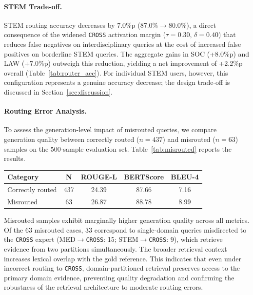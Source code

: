 \documentclass[a4paper,fleql]{cas-sc}
\begin{document}
\paragraph{STEM Trade-off.}
STEM routing accuracy decreases by 7.0\%p (87.0\%$\to$80.0\%), a direct
consequence of the widened \texttt{CROSS} activation margin ($\tau{=}0.30$,
$\delta{=}0.40$) that reduces false negatives on interdisciplinary queries
at the cost of increased false positives on borderline STEM queries. The
aggregate gains in SOC (+8.0\%p) and LAW (+7.0\%p) outweigh this reduction,
yielding a net improvement of +2.2\%p overall (Table~\ref{tab:router_acc}).
For individual STEM users, however, this configuration represents a genuine
accuracy decrease; the design trade-off is discussed in
Section~\ref{sec:discussion}.

\paragraph{Routing Error Analysis.}
To assess the generation-level impact of misrouted queries, we compare
generation quality between correctly routed ($n{=}437$) and misrouted
($n{=}63$) samples on the 500-sample evaluation set.
Table~\ref{tab:misrouted} reports the results.

\vspace{6pt plus 4pt minus 3pt}
\begin{center}
\begingroup
{}
\label{tab:misrouted}
\begin{tabular}{lcccc}
\toprule
\textbf{Category} & \textbf{N} & \textbf{ROUGE-L} & \textbf{BERTScore} & \textbf{BLEU-4} \\
\midrule
Correctly routed & 437 & 24.39 & 87.66 & 7.16 \\
Misrouted        &  63 & 26.87 & 88.78 & 8.99 \\
\bottomrule
\end{tabular}
\endgroup
\end{center}
\vspace{6pt plus 4pt minus 3pt}

Misrouted samples exhibit marginally higher generation quality across all
metrics. Of the 63 misrouted cases, 33 correspond to single-domain queries
misdirected to the \texttt{CROSS} expert (MED$\to$\texttt{CROSS}: 15;
STEM$\to$\texttt{CROSS}: 9), which retrieve evidence from two partitions
simultaneously. The broader retrieval context increases lexical overlap with
the gold reference. This indicates that even under incorrect routing to
\texttt{CROSS}, domain-partitioned retrieval preserves access to the primary
domain evidence, preventing quality degradation and confirming the robustness
of the retrieval architecture to moderate routing errors.
\end{document}
